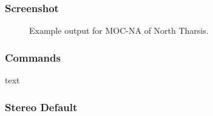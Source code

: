 \subsubsection*{Screenshot}

\begin{figure}[h!]
\centering
  \hfil
\caption{Example output for MOC-NA of North Tharsis.}
\label{fig:mocna_n_tharsis_example}
\end{figure}

\subsubsection*{Commands}

text

\subsubsection*{Stereo Default}

